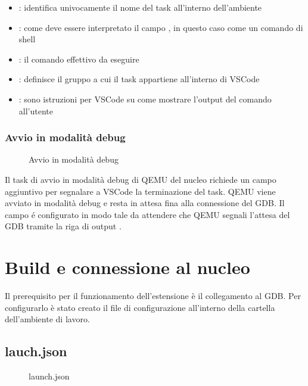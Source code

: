 \begin{itemize}
    \item {}: identifica univocamente il nome del task all'interno dell'ambiente
    \item {}: come deve essere interpretato il campo , in questo caso come un comando di shell
    \item {}: il comando effettivo da eseguire
    \item {}: definisce il gruppo a cui il task appartiene all'interno di VSCode
    \item {}: sono istruzioni per VSCode su come mostrare l'output del comando all'utente 
\end{itemize}

\subsubsection*{Avvio in modalità debug}   

\begin{figure}[H]
    
    \caption{Avvio in modalità debug}
\end{figure}

Il task di avvio in modalità debug di QEMU del nucleo richiede un campo aggiuntivo per segnalare a VSCode la terminazione del task. QEMU viene avviato in modalità debug e resta in attesa fina alla connessione del GDB. Il campo  é configurato in modo tale da attendere che QEMU segnali l'attesa del GDB tramite la riga di output  .

\section{Build e connessione al nucleo}
Il prerequisito per il funzionamento dell'estensione è il collegamento al GDB. Per configurarlo è stato creato il file di configurazione  all'interno della cartella  dell'ambiente di lavoro. 

\subsection*{lauch.json}

\begin{figure}[H]
    
    \caption{launch.json}
\end{figure}

